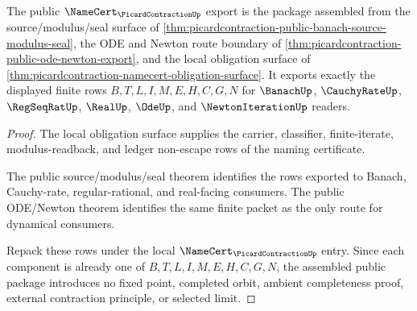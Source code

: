 \begin{theorem}
\label{thm:picardcontraction-public-namecert-package}
The public $\NameCert_{\PicardContractionUp}$ export is the package assembled
from the source/modulus/seal surface of
\autoref{thm:picardcontraction-public-banach-source-modulus-seal}, the ODE and
Newton route boundary of \autoref{thm:picardcontraction-public-ode-newton-export},
and the local obligation surface of
\autoref{thm:picardcontraction-namecert-obligation-surface}. It exports exactly
the displayed finite rows $B,T,L,I,M,E,H,C,G,N$ for $\BanachUp$,
$\CauchyRateUp$, $\RegSeqRatUp$, $\RealUp$, $\OdeUp$, and
$\NewtonIterationUp$ readers.
\end{theorem}
\begin{proof}
The local obligation surface supplies the carrier, classifier,
finite-iterate, modulus-readback, and ledger non-escape rows of the naming
certificate.

The public source/modulus/seal theorem identifies the rows exported to Banach,
Cauchy-rate, regular-rational, and real-facing consumers. The public ODE/Newton
theorem identifies the same finite packet as the only route for dynamical
consumers.

Repack these rows under the local $\NameCert_{\PicardContractionUp}$ entry.
Since each component is already one of $B,T,L,I,M,E,H,C,G,N$, the assembled
public package introduces no fixed point, completed orbit, ambient completeness
proof, external contraction principle, or selected limit.
\end{proof}

